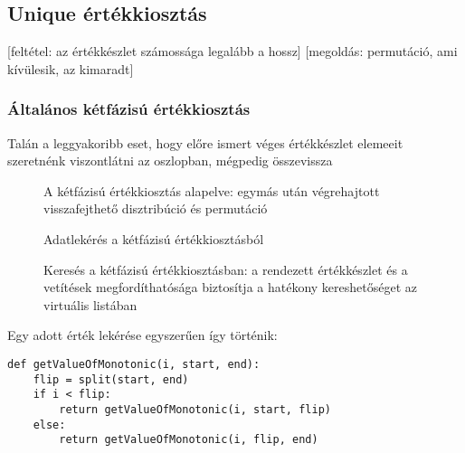 \documentclass[
    parspace,
    noindent,
    nohyp,
]{elteiktdk}[2023/04/10]
\begin{document}
\subsection{Unique értékkiosztás}


[feltétel: az értékkészlet számossága legalább a hossz]
[megoldás: permutáció, ami kívülesik, az kimaradt]

\subsubsection{Általános kétfázisú értékkiosztás}


Talán a leggyakoribb eset, hogy előre ismert véges értékkészlet elemeeit szeretnénk viszontlátni az oszlopban,
mégpedig összevissza

\begin{figure}[H]
\centering

\caption{A kétfázisú értékkiosztás alapelve: egymás után végrehajtott visszafejthető disztribúció és permutáció}
\label{A kétfázisú értékkiosztás alapelve}
\end{figure}

\begin{figure}[H]
\centering

\caption{Adatlekérés a kétfázisú értékkiosztásból}
\label{Adatlekérés a kétfázisú értékkiosztásból}
\end{figure}

\begin{figure}[H]
\centering

\caption{Keresés a kétfázisú értékkiosztásban: a rendezett értékkészlet és a vetítések megfordíthatósága biztosítja a hatékony kereshetőséget az virtuális listában}
\label{Keresés a kétfázisú értékkiosztásban}
\end{figure}

Egy adott érték lekérése egyszerűen így történik:

\begin{verbatim}
def getValueOfMonotonic(i, start, end):
    flip = split(start, end)
    if i < flip:
        return getValueOfMonotonic(i, start, flip)
    else:
        return getValueOfMonotonic(i, flip, end)
\end{verbatim}

\end{document}
